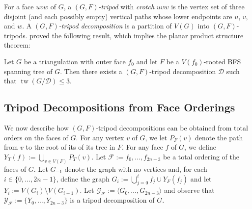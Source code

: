 \documentclass{patmorin}
\DeclareMathOperator{\tw}{tw}
\begin{document}
%

For a face $uvw$ of $G$, a \emph{$(G,F)$-tripod} with \emph{crotch} $uvw$ is the vertex set of three disjoint (and each possibly empty) vertical paths whose lower endpoints are $u$, $v$, and $w$.  A \emph{$(G,F)$-tripod decomposition} is a partition of $V(G)$ into $(G,F)$-tripods. \citet{dujmovic.joret.ea:planar} proved the following result, which implies the planar product structure theorem:

\begin{thm}\label{tripod_decomposition}
  Let $G$ be a triangulation with outer face $f_0$ and let $F$ be a $V(f_0)$-rooted BFS spanning tree of $G$.  Then there exists a $(G,F)$-tripod decomposition $\mathcal{D}$ such that $\tw(G/\mathcal{D})\le 3$.
\end{thm}


\subsection{Tripod Decompositions from Face Orderings}

We now describe how $(G,F)$-tripod decompositions can be obtained from total orders on the faces of $G$.  For any vertex $v$ of $G$, we let $P_F(v)$ denote the path from $v$ to the root of its of its tree in $F$.  For any face $f$ of $G$, we define $Y_T(f):=\bigcup_{v\in V(F)} P_T(v)$.  Let $\mathcal{F}:=f_0,\ldots,f_{2n-3}$ be a total ordering of the faces of $G$. Let $G_{-1}$ denote the graph with no vertices and, for each $i\in\{0,\ldots,2n-1\}$, define the graph $G_i:=\bigcup_{j=0}^i f_j\cup Y_F(f_j)$ and let $Y_i:=V(G_i)\setminus V(G_{i-1})$.  Let $\mathcal{G_F}:=\langle G_0,\ldots,G_{2n-3}\rangle$ and observe that $\mathcal{Y_F}:=\{Y_0,\ldots,Y_{2n-3}\}$ is a tripod decomposition of $G$.
\end{document}
